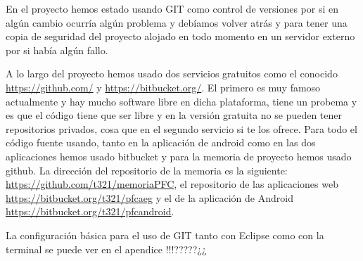 En el proyecto hemos estado usando GIT como control de versiones por si en algún cambio ocurría algún problema y debíamos volver atrás y para tener una copia de seguridad del proyecto alojado en todo momento en un servidor externo por si había algún fallo.

A lo largo del proyecto hemos usado dos servicios gratuitos como el conocido \url{https://github.com/} y \url{https://bitbucket.org/}. El primero es muy famoso actualmente y hay mucho software libre en dicha plataforma, tiene un probema y es que el código tiene que ser libre y en la versión gratuita no se pueden tener repositorios privados, cosa que en el segundo servicio si te los ofrece. Para todo el código fuente usando, tanto en la aplicación de android como en las dos aplicaciones hemos usado bitbucket y para la memoria de proyecto hemos usado github. La dirección del repositorio de la memoria es la siguiente: \url{https://github.com/t321/memoriaPFC}, el repositorio de las aplicaciones web \url{https://bitbucket.org/t321/pfcaeg} y el de la aplicación de Android \url{https://bitbucket.org/t321/pfcandroid}.

La configuración básica para el uso de GIT tanto con Eclipse como con la terminal se puede ver en el apendice !!!?????¿¿  














